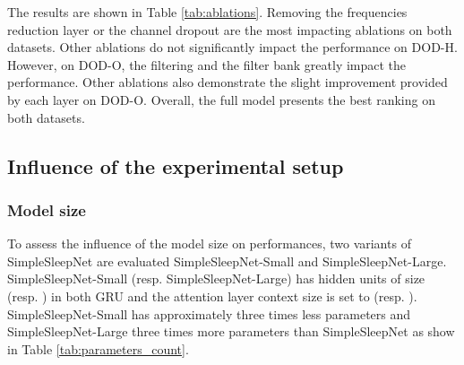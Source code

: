 \documentclass[journal]{IEEEtran}
\begin{document}
The results are shown in Table \ref{tab:ablations}. 
Removing the frequencies reduction layer or the channel dropout are the most impacting ablations on both datasets. Other ablations do not significantly impact the performance on DOD-H. However, on DOD-O, the filtering and the filter bank greatly impact the performance. Other ablations also demonstrate the slight improvement provided by each layer on DOD-O. Overall, the full model presents the best ranking on both datasets.

\subsection{Influence of the experimental setup}

\subsubsection{Model size}
To assess the influence of the model size on performances, two variants of SimpleSleepNet are evaluated SimpleSleepNet-Small and SimpleSleepNet-Large. SimpleSleepNet-Small  (resp. SimpleSleepNet-Large) has hidden units of size  (resp. ) in both GRU and the attention layer context size is set to  (resp. ). SimpleSleepNet-Small has approximately three times less parameters and SimpleSleepNet-Large three times more parameters than SimpleSleepNet as show in Table \ref{tab:parameters_count}. 

\begin{table}[ht]
\centering
{}
\caption{Performance metrics of SimpleSleepNet variants with smaller (SimpleSleepNet-Small) and larger (SimpleSleepNet-Large) layer size than the original models. }
\label{tab:model_size}
\vspace{-2em}
\end{table}
 
\end{document}
